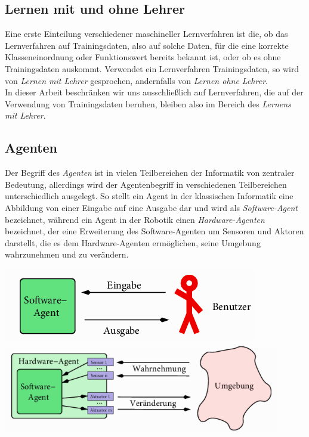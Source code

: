 \documentclass[fontsize=11pt]{scrartcl}
\newenvironment{Figure}
  {\par\medskip\noindent\minipage{\linewidth}}
  {\endminipage\par\medskip}
\begin{document}
            \subsection{Lernen mit und ohne Lehrer}
                Eine erste Einteilung verschiedener maschineller Lernverfahren ist die, ob das Lernverfahren auf Trainingsdaten, also auf solche Daten, für die eine korrekte Klasseneinordnung oder Funktionswert bereits bekannt ist, oder ob es ohne Trainingsdaten auskommt. Verwendet ein Lernverfahren Trainingsdaten, so wird von \emph{Lernen mit Lehrer} gesprochen, andernfalls von \emph{Lernen ohne Lehrer}.\\
                In dieser Arbeit beschränken wir uns ausschließlich auf Lernverfahren, die auf der Verwendung von Trainingsdaten beruhen, bleiben also im Bereich des \emph{Lernens mit Lehrer}.
            \subsection{Agenten}
                Der Begriff des \emph{Agenten} ist in vielen Teilbereichen der Informatik von zentraler Bedeutung, allerdings wird der Agentenbegriff in verschiedenen Teilbereichen unterschiedlich ausgelegt. So stellt ein Agent in der klassischen Informatik eine Abbildung von einer Eingabe auf eine Ausgabe dar und wird als \emph{Software-Agent} bezeichnet, während ein Agent in der Robotik einen \emph{Hardware-Agenten} bezeichnet, der eine Erweiterung des Software-Agenten um Sensoren und Aktoren darstellt, die es dem Hardware-Agenten ermöglichen, seine Umgebung wahrzunehmen und zu verändern. \cite{ertel2016}
                \begin{Figure}
                    \centering
                    \includegraphics[scale=0.6]{softwareagent.png}
                    \includegraphics[scale=0.6]{hardwareagent.png}
                \end{Figure}
\end{document}
